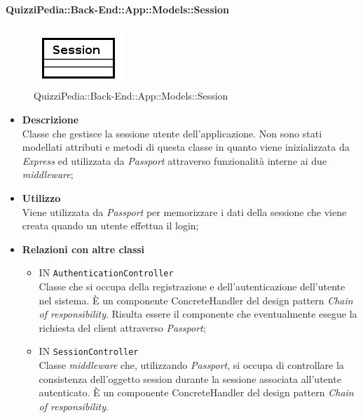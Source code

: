 \paragraph{QuizziPedia::Back-End::App::Models::Session}
\label{QuizziPedia::Back-End::App::Models::Session}
\begin{figure}[ht]
	\centering
	\includegraphics[scale=0.45]{UML/Classi/Back-End/QuizziPedia_Back-End_App_Models_sessionModel.png}
	\caption{QuizziPedia::Back-End::App::Models::Session}
\end{figure}
\FloatBarrier
	\begin{itemize}
		\item \textbf{Descrizione} \\
		Classe che gestisce la sessione utente dell'applicazione. Non sono stati modellati attributi e metodi di questa classe in quanto viene inizializzata da \textit{Express} ed utilizzata da \textit{Passport} attraverso funzionalità interne ai due \textit{middleware};
		\item \textbf{Utilizzo} \\
		Viene utilizzata da \textit{Passport} per memorizzare i dati della sessione che viene creata quando un utente effettua il login;
		\item \textbf{Relazioni con altre classi} \\
			\begin{itemize}
				\item
				IN \texttt{AuthenticationController} \\
				Classe che si occupa della registrazione e dell'autenticazione dell'utente nel sistema. È un componente ConcreteHandler del design pattern \textit{Chain of responsibility}. Risulta essere il componente che eventualmente esegue la richiesta del client attraverso \textit{Passport};			
				\item
				IN \texttt{SessionController} \\
				Classe \textit{middleware} che, utilizzando \textit{Passport}, si occupa di controllare la consistenza dell'oggetto session durante la sessione associata all'utente autenticato. È un componente ConcreteHandler del design pattern \textit{Chain of responsibility}.
			\end{itemize}
	\end{itemize}